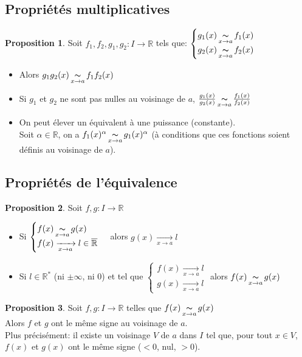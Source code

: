 \documentclass[10pt,a4paper]{article}
\theoremstyle{definition}
\newtheorem{proposition}{Proposition}[section]
\DeclareMathOperator*{\eqv}{\thicksim}
\begin{document}
\subsection{Propriétés multiplicatives}
\begin{proposition}
Soit $f_1, f_2, g_1, g_2: I \to \mathbb{R}$ tels que: $\begin{cases}
g_1(x) \eqv\limits_{x \to a} f_1(x) \\
g_2(x) \eqv\limits_{x \to a} f_2(x)
\end{cases}$
\begin{itemize}
\item Alors $g_1 g_2 (x) \eqv\limits_{x \to a} f_1 f_2 (x)$
\item Si $g_1$ et $g_2$ ne sont pas nulles au voisinage de $a$, $\frac{g_1(x)}{g_2(x)} \eqv\limits_{x \to a} \frac{f_1(x)}{f_2(x)}$
\item On peut élever un équivalent à une puissance (constante). \\
Soit $\alpha \in \mathbb{R}$, on a $f_1(x)^\alpha \eqv\limits_{x \to a} g_1(x)^\alpha$ (à conditions que ces fonctions soient définis au voisinage de $a$).
\end{itemize}
\end{proposition}

\subsection{Propriétés de l'équivalence}
\begin{proposition}
Soit $f, g: I \to \mathbb{R}$
\begin{itemize}
\item Si $\begin{cases}
f(x) \eqv\limits_{x \to a} g(x) \\
f(x) \xrightarrow[x \to a]{} l \in \overline{\mathbb{R}}
\end{cases}$ alors $g(x) \xrightarrow[x \to a]{} l$
\item Si $l \in \mathbb{R}^*$ (ni $\pm\infty$, ni 0) et tel que $\begin{cases}
f(x) \xrightarrow[x \to a]{} l \\
g(x) \xrightarrow[x \to a]{} l
\end{cases}$ alors $f(x) \eqv\limits_{x \to a} g(x)$
\end{itemize}
\end{proposition}
\begin{proposition}
Soit $f,g: I \to \mathbb{R}$ telles que $f(x) \eqv\limits_{x \to a} g(x)$ \\
Alors $f$ et $g$ ont le même signe au voisinage de $a$. \\
Plus précisément: il existe un voisinage $V$ de $a$ dans $I$ tel que, pour tout $x \in V$, $f(x)$ et $g(x)$ ont le même signe ($<0$, nul, $>0$).
\end{proposition}
\end{document}
